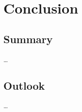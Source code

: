 

\chapter{Conclusion}
\label{ch:Conclusion}

\section{Summary}
\label{sec:Conclusion:Summary}

\dots

\section{Outlook}
\label{sec:Conclusion:Outlook}

\dots
